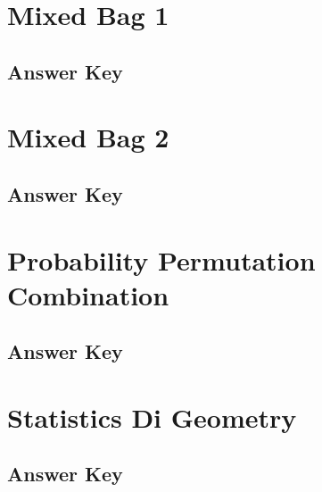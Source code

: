 \documentclass[12pt,a4paper]{book}
\newcounter{totalcounter}
\begin{document}


\setcounter{totalcounter}{1}

\section{Mixed Bag 1}



\subsection*{Answer Key}



\setcounter{totalcounter}{1}

\section{Mixed Bag 2}



\subsection*{Answer Key}



\setcounter{totalcounter}{1}

\section{Probability Permutation Combination}



\subsection*{Answer Key}



\setcounter{totalcounter}{1}

\section{Statistics Di Geometry}



\subsection*{Answer Key}


\end{document}
